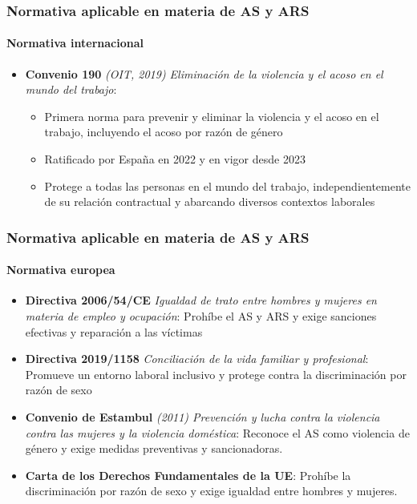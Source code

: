 \documentclass{beamer}
\begin{document}
    \begin{frame}
        \frametitle{Normativa aplicable en materia de AS y ARS}
        \framesubtitle{Normativa internacional}
        \begin{itemize}
            \item \textbf{Convenio 190} \textit{(OIT, 2019) Eliminación de la violencia y el acoso en el mundo del trabajo}:
            \begin{itemize}
                \item Primera norma para prevenir y eliminar la violencia y el acoso en el trabajo, incluyendo el acoso por razón de género
                \item Ratificado por España en 2022 y en vigor desde 2023
                \item Protege a todas las personas en el mundo del trabajo, independientemente de su relación contractual y abarcando diversos contextos laborales
            \end{itemize}
        \end{itemize}
    \end{frame}

    \begin{frame}
        \frametitle{Normativa aplicable en materia de AS y ARS}
        \framesubtitle{Normativa europea}
        \begin{itemize}
            \item \textbf{Directiva 2006/54/CE} \textit{Igualdad de trato entre hombres y mujeres en materia de empleo y ocupación}: Prohíbe el AS y ARS y exige sanciones efectivas y reparación a las víctimas
            \item \textbf{Directiva 2019/1158} \textit{Conciliación de la vida familiar y profesional}: Promueve un entorno laboral inclusivo y protege contra la discriminación por razón de sexo
            \item \textbf{Convenio de Estambul} \textit{(2011) Prevención y lucha contra la violencia contra las mujeres y la violencia doméstica}: Reconoce el AS como violencia de género y exige medidas preventivas y sancionadoras.
            \item \textbf{Carta de los Derechos Fundamentales de la UE}: Prohíbe la discriminación por razón de sexo y exige igualdad entre hombres y mujeres.
        \end{itemize}
    \end{frame}
\end{document}
